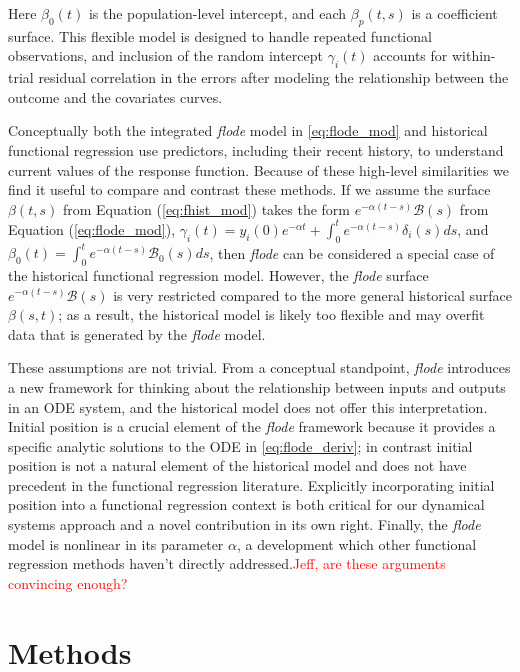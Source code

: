 \documentclass[preprint]{JASA}
\begin{document}
\noindent Here \(\beta_0(t)\) is the population-level intercept, and
each \(\beta_p(t,s)\) is a coefficient surface. This flexible model is
designed to handle repeated functional observations, and inclusion of
the random intercept \(\gamma_i(t)\) accounts for within-trial residual
correlation in the errors after modeling the relationship between the
outcome and the covariates curves.

Conceptually both the integrated \emph{flode} model in
\ref{eq:flode_mod} and historical functional regression use predictors,
including their recent history, to understand current values of the
response function. Because of these high-level similarities we find it
useful to compare and contrast these methods. If we assume the surface
\(\beta(t,s)\) from Equation (\ref{eq:fhist_mod}) takes the form
\(e^{-\alpha (t-s)} \mathcal{B}(s)\) from Equation (\ref{eq:flode_mod}),
\(\gamma_i(t) = y_i(0)e^{-\alpha t} + \int_0^t e^{-\alpha (t-s)}\delta_i(s)ds\),
and \(\beta_0(t) = \int_0^t e^{-\alpha (t-s)}\mathcal{B}_0(s)ds\), then
\emph{flode} can be considered a special case of the historical
functional regression model. However, the \emph{flode} surface
\(e^{-\alpha (t-s)} \mathcal{B}(s)\) is very restricted compared to the
more general historical surface \(\beta(s,t)\); as a result, the
historical model is likely too flexible and may overfit data that is
generated by the \emph{flode} model.

These assumptions are not trivial. From a conceptual standpoint,
\emph{flode} introduces a new framework for thinking about the
relationship between inputs and outputs in an ODE system, and the
historical model does not offer this interpretation. Initial position is
a crucial element of the \emph{flode} framework because it provides a
specific analytic solutions to the ODE in \ref{eq:flode_deriv}; in
contrast initial position is not a natural element of the historical
model and does not have precedent in the functional regression
literature. Explicitly incorporating initial position into a functional
regression context is both critical for our dynamical systems approach
and a novel contribution in its own right. Finally, the \emph{flode}
model is nonlinear in its parameter \(\alpha\), a development which
other functional regression methods haven't directly
addressed.\textcolor{red}{Jeff, are these arguments convincing enough?}

\hypertarget{methods}{%
\section{Methods}\label{methods}}
\end{document}

